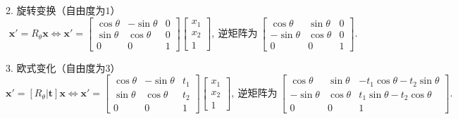 \documentclass[12pt, a4paper, oneside]{ctexart}
\numberwithin{equation}{section}  %
\theoremstyle{definition}
\def\bd{\boldsymbol}        %
\begin{document}
2. 旋转变换（自由度为$1$）
\begin{equation*}
    \bd{x}' = R_{\theta}\bd{x}\iff \bd{x}' = \left[\begin{matrix}
        \cos\theta&-\sin\theta&0\\
        \sin\theta&\cos\theta&0\\
        0&0&1
    \end{matrix}\right]\left[\begin{matrix}
        x_1\\x_2\\1
    \end{matrix}\right],\ \text{逆矩阵为}\ \left[\begin{matrix}
        \cos\theta&\sin\theta&0\\
        -\sin\theta&\cos\theta&0\\
        0&0&1
    \end{matrix}\right].
\end{equation*}

3. 欧式变化（自由度为$3$）
\begin{equation*}
    \bd{x}' = [R_\theta|\bd{t}]\bd{x}\iff \bd{x}' = \left[\begin{matrix}
        \cos\theta&-\sin\theta&t_1\\
        \sin\theta&\cos\theta&t_2\\
        0&0&1
    \end{matrix}\right]\left[\begin{matrix}
        x_1\\x_2\\1
    \end{matrix}\right],\ \text{逆矩阵为}\ \left[\begin{matrix}
        \cos\theta&\sin\theta&-t_1\cos\theta-t_2\sin\theta\\
        -\sin\theta&\cos\theta&t_1\sin\theta-t_2\cos\theta\\
        0&0&1
    \end{matrix}\right].
\end{equation*}
\end{document}
